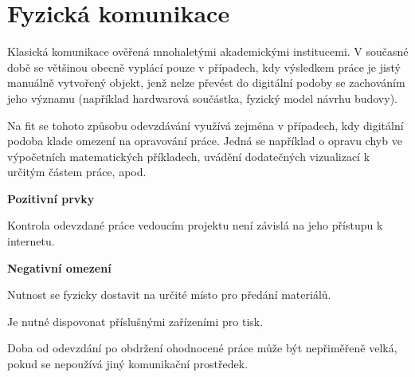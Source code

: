 \section{Fyzická komunikace}

Klasická komunikace ověřená mnohaletými akademickými institucemi. V současné době se většinou obecně vyplácí pouze v případech, kdy výsledkem práce je jistý manuálně vytvořený objekt, jenž nelze převést do digitální podoby se zachováním jeho významu (například hardwarová součástka, fyzický model návrhu budovy).

Na \gls{fit} se tohoto způsobu odevzdávání využívá zejména v případech, kdy digitální podoba klade omezení na opravování práce. Jedná se například o opravu chyb ve výpočetních matematických příkladech, uvádění dodatečných vizualizací k určitým částem práce, apod.

\textbf{Pozitivní prvky}

\begin{ul}
   \item
   Kontrola odevzdané práce vedoucím projektu není závislá na jeho přístupu k internetu.
\end{ul}

\textbf{Negativní omezení}

\begin{ul}
   \item
   Nutnost se fyzicky dostavit na určité místo pro předání materiálů.
   \item
   Je nutné dispovonat příslušnými zařízeními pro tisk.
   \item
   Doba od odevzdání po obdržení ohodnocené práce může být nepřiměřeně velká, pokud se nepoužívá jiný komunikační prostředek.
\end{ul}
